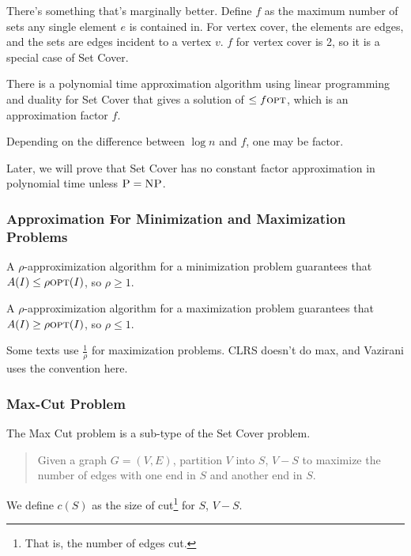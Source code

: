                 There's something that's marginally better.
                Define $f$ as the maximum number of sets any single element $e$ is contained in.
                For vertex cover, the elements are edges, and the sets are edges incident to a vertex $v$.
                $f$ for vertex cover is 2, so it is a special case of Set Cover.

                There is a polynomial time approximation algorithm using linear programming and duality for Set Cover that gives a solution of $\le f \textsc{opt}$, which is an approximation factor $f$.

                Depending on the difference between $\log n$ and $f$, one may be factor.

                Later, we will prove that Set Cover has no constant factor approximation in polynomial time unless $\textsc{P} = \textsc{NP}$.

                \subsubsection{Approximation For Minimization and Maximization Problems} %
                \label{ssub:approximation_for_minimization_and_maximization_problems}
                    A $\rho$-approximization algorithm for a minimization problem guarantees that $A(I) \le \rho \textsc{opt}(I)$, so $\rho \ge 1$.

                    A $\rho$-approximization algorithm for a maximization problem guarantees that $A(I) \ge \rho \textsc{opt}(I)$, so $\rho \le 1$.

                    Some texts use $\frac{1}{\rho}$ for maximization problems.
                    CLRS doesn't do max, and Vazirani uses the convention here.
                \subsubsection{Max-Cut Problem} %
                \label{ssub:max_cut_problem}
                    The Max Cut problem is a sub-type of the Set Cover problem.
                    \begin{quotation}
                        Given a graph $G = (V, E)$, partition $V$ into $S$, $V - S$ to maximize the number of edges with one end in $S$ and another end in $S$.
                    \end{quotation}
                    We define $c(S)$ as the size of cut\footnote{That is, the number of edges cut.} for $S$, $V - S$.

